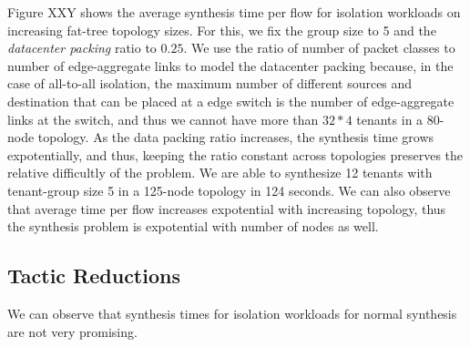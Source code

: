 Figure XXY shows the average synthesis time per flow for isolation workloads on increasing fat-tree topology sizes. For this, we fix the group size to 5 and the {\em datacenter packing} ratio to $0.25$. We use the ratio of number of packet classes to number of edge-aggregate links to model the datacenter packing because, in the case of all-to-all isolation, the maximum number of different sources and destination that can be placed at a edge switch is the number of edge-aggregate links at the switch, and thus we cannot have more than $32*4$ tenants in a 80-node topology. As the data packing ratio increases, the synthesis time grows expotentially, and thus, keeping the ratio constant across topologies preserves the relative difficultly of the problem. We are able to synthesize 12 tenants with tenant-group size 5 in a 125-node topology in 124 seconds. We can also observe that average time per flow increases expotential with increasing topology, thus the synthesis problem is expotential with number of nodes as well. 

\subsection{Tactic Reductions}
We can observe that synthesis times for isolation workloads for normal synthesis are not very promising.

